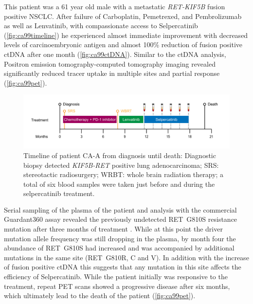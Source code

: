 This patient was a 61 year old male  with a metastatic \textit{RET-KIF5B} fusion positive NSCLC. After failure of Carboplatin, Pemetrexed, and Pembrolizumab as well as Lenvatinib, with compassionate access to Selpercatinib (\autoref{fig:ca99timeline}) he experienced almost immediate improvement with decreased levels of carcinoembryonic antigen and almost 100\% reduction of fusion positive ctDNA after one month (\autoref{fig:ca99ctDNA}). Similar to the ctDNA analysis, Positron emission tomography-computed tomography imaging revealed significantly reduced tracer uptake in multiple sites and partial response (\autoref{fig:ca99pet}).

\begin{figure}[ht]
\centering
\includegraphics[width=.99\linewidth]{Figures/CASCADE/CA99/CA-A_timeline}
\caption[Timeline of patient CA-A from diagnosis until death]{Timeline of patient CA-A from diagnosis until death: Diagnostic biopsy detected \textit{KIF5B-RET} positive lung adenocarcinoma; SRS: stereotactic radiosurgery; WRBT: whole brain radiation therapy; a total of six blood samples were taken just before and during the selpercatinib treatment.} \label{fig:ca99timeline}
\end{figure}


Serial sampling of the plasma of the patient and analysis with the commercial Guardant360 assay \cite{Talasaz2014} revealed the previously undetected RET~G810S resistance mutation after three months of treatment . While at this point the driver mutation allele frequency was still dropping in the plasma, by month four the abundance of RET~G810S had increased and was accompanied by additional mutations in the same site (RET~G810R, C and V). In addition with the increase of fusion positive ctDNA this suggests that any mutation in this site affects the efficiency of Selpercatinib. While the patient initially was responsive to the treatment, repeat PET scans showed a progressive disease after six months, which ultimately lead to the death of the patient (\autoref{fig:ca99pet}).

